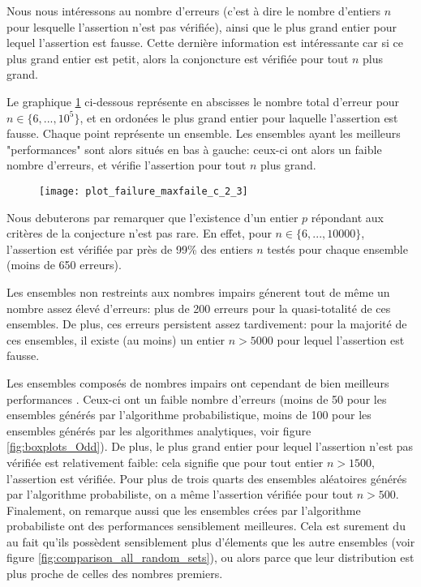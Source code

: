 \documentclass[../main.text]{report}
\begin{document}
Nous nous intéressons au nombre d'erreurs (c'est à dire le nombre d'entiers $n$ pour lesquelle l'assertion n'est pas vérifiée), ainsi que le plus grand entier pour lequel l'assertion est fausse. Cette dernière information est intéressante car si ce plus grand entier est petit, alors la conjoncture est vérifiée pour tout $n$ plus grand.

Le graphique \ref{fig:failures_2_3} ci-dessous représente en abscisses le nombre total d'erreur pour $n \in \{6,...,10^5\}$, et en ordonées le plus grand entier pour laquelle l'assertion est fausse. Chaque point représente un ensemble. Les ensembles ayant les meilleurs "performances" sont alors situés en bas à gauche: ceux-ci ont alors un faible nombre d'erreurs, et vérifie l'assertion pour tout $n$ plus grand. 

\begin{figure}[H]
\centering
\texttt{[image: plot\_failure\_maxfaile\_c\_2\_3]}
\caption{}
\label{fig:failures_2_3}
\end{figure}

Nous debuterons par remarquer que l'existence d'un entier $p$ répondant aux critères de la conjecture n'est pas rare. En effet, pour $ n \in \{6,...,10000\}$, l'assertion est vérifiée par près de 99\% des entiers $n$ testés pour chaque ensemble (moins de 650 erreurs). 

Les ensembles non restreints aux nombres impairs génerent tout de même un nombre assez élevé d'erreurs: plus de 200 erreurs pour la quasi-totalité de ces ensembles.
De plus, ces erreurs persistent assez tardivement: pour la majorité de ces ensembles, il existe (au moins) un entier $n > 5000$ pour lequel l'assertion est fausse. 


Les ensembles composés de nombres impairs ont cependant de bien meilleurs performances . Ceux-ci ont un faible nombre d'erreurs (moins de 50 pour les ensembles générés par l'algorithme probabilistique, moins de 100 pour les ensembles générés par les algorithmes analytiques, voir figure \ref{fig:boxplots_Odd}). 
De plus, le plus grand entier pour lequel l'assertion n'est pas vérifiée est relativement faible: cela signifie que pour tout entier $n > 1500$, l'assertion est vérifiée. Pour plus de trois quarts des ensembles aléatoires générés par l'algorithme probabiliste, on a même l'assertion vérifiée pour tout $n > 500$.
Finalement, on remarque aussi que les ensembles crées par l'algorithme probabiliste ont des performances sensiblement meilleures. Cela est surement du au fait qu'ils possèdent sensiblement plus d'élements que les autre ensembles (voir figure \ref{fig:comparison_all_random_sets}), ou alors parce que leur distribution est plus proche de celles des nombres premiers.
\end{document}
